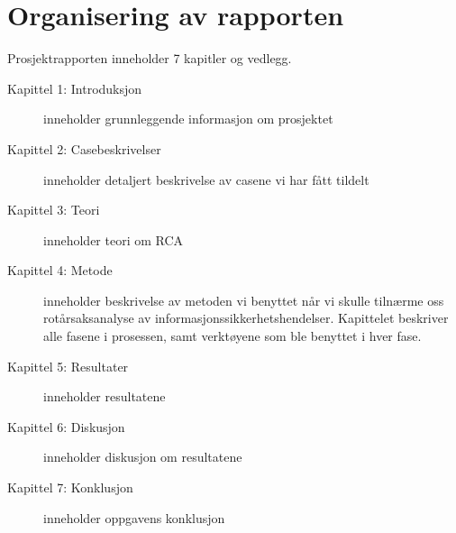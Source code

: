 \section{Organisering av rapporten}
\label{sec:organisering_rapport}
Prosjektrapporten inneholder 7 kapitler og vedlegg.


\begin{description}
    \item [Kapittel 1: Introduksjon] inneholder grunnleggende informasjon om prosjektet
    \item [Kapittel 2: Casebeskrivelser] inneholder detaljert beskrivelse av casene vi har fått tildelt
    \item [Kapittel 3: Teori] inneholder teori om RCA
    \item [Kapittel 4: Metode] inneholder beskrivelse av metoden vi benyttet når vi skulle tilnærme oss rotårsaksanalyse av informasjonssikkerhetshendelser. Kapittelet beskriver alle fasene i prosessen, samt verktøyene som ble benyttet i hver fase. 
    \item [Kapittel 5: Resultater] inneholder resultatene 
    \item [Kapittel 6: Diskusjon] inneholder diskusjon om resultatene
    \item [Kapittel 7: Konklusjon] inneholder oppgavens konklusjon
\end{description}